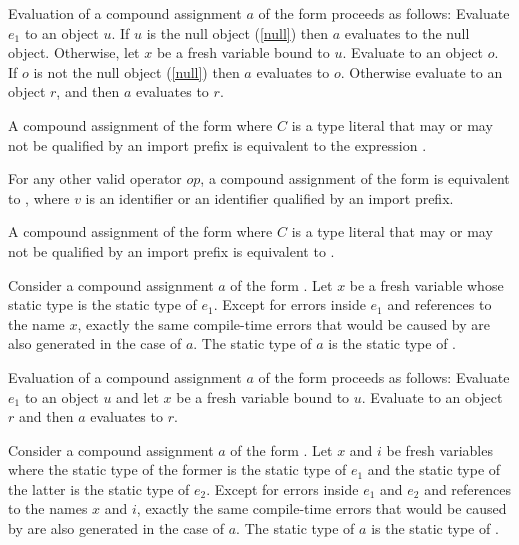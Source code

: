 \documentclass[makeidx]{article}
\begin{document}
{\LMHash{}%
Evaluation of a compound assignment $a$ of the form 
proceeds as follows:
Evaluate $e_1$ to an object $u$.
If $u$ is the null object (\ref{null}) then $a$ evaluates to the null object.
Otherwise, let $x$ be a fresh variable bound to $u$.
Evaluate  to an object $o$.
If $o$ is not the null object (\ref{null}) then $a$ evaluates to $o$.
Otherwise evaluate  to an object $r$,
and then $a$ evaluates to $r$.
\EndCase

\LMHash{}%
A compound assignment of the form 
where $C$ is a type literal
that may or may not be qualified by an import prefix
is equivalent to the expression .
\EndCase

\LMHash{}%
For any other valid operator $op$,
a compound assignment of the form 
is equivalent to ,
where $v$ is an identifier or an identifier qualified by an import prefix.
\EndCase

\LMHash{}%
A compound assignment of the form 
where $C$ is a type literal
that may or may not be qualified by an import prefix
is equivalent to .
\EndCase

\LMHash{}%
Consider a compound assignment $a$ of the form .
Let $x$ be a fresh variable whose static type is the static type of $e_1$.
Except for errors inside $e_1$ and references to the name $x$,
exactly the same compile-time errors that would be caused by
are also generated in the case of $a$.
The static type of $a$ is the static type of .

\LMHash{}%
Evaluation of a compound assignment $a$ of the form 
proceeds as follows:
Evaluate $e_1$ to an object $u$ and let $x$ be a fresh variable bound to $u$.
Evaluate  to an object $r$
and then $a$ evaluates to $r$.
\EndCase

\LMHash{}%
Consider a compound assignment $a$ of the form .
Let $x$ and $i$ be fresh variables
where the static type of the former is the static type of $e_1$
and the static type of the latter is the static type of $e_2$.
Except for errors inside $e_1$ and $e_2$ and references to the names $x$ and $i$,
exactly the same compile-time errors that would be caused by
are also generated in the case of $a$.
The static type of $a$ is the static type of .

}
\end{document}
